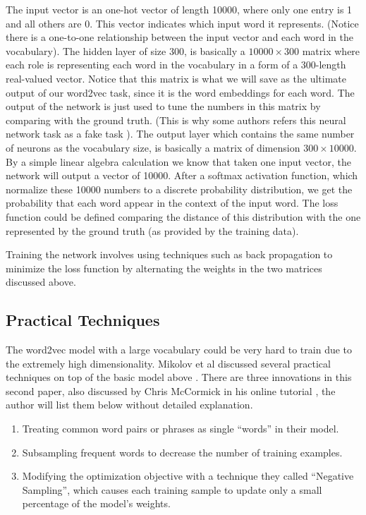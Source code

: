 \documentclass[11pt]{article}
\theoremstyle{plain}
\begin{document}
The input vector is an one-hot vector of length 10000, where only one entry 
is 1 and all others are 0. This vector indicates which input word it represents. 
(Notice there is a one-to-one relationship between the input vector and each 
word in the vocabulary). The hidden layer of size 300, is basically a 
$10000\times 300$ matrix where each role is representing each word in the 
vocabulary in a form of a 300-length real-valued vector. Notice that this 
matrix is what we will save as the ultimate output of our word2vec task, since 
it is the word embeddings for each word. The output of the network is just 
used to tune the numbers in this matrix by comparing with the ground truth. 
(This is why some authors refers this neural network task as a fake task 
\cite{w2v-tutorial}). The output layer which contains the same number of 
neurons as the vocabulary size, is basically a matrix of dimension $300\times 
10000$. By a simple linear algebra calculation we know that taken one input 
vector, the network will output a vector of 10000. After a softmax activation 
function, which normalize these 10000 numbers to a discrete probability 
distribution, we get the probability that each word appear in the context of 
the input word. The loss function could be defined comparing the distance of 
this distribution with the one represented by the ground truth (as provided 
by the training data). 

Training the network involves using techniques such as back propagation to 
minimize the loss function by alternating the weights in the two matrices 
discussed above. 

\subsection{Practical Techniques} 
The word2vec model with a large vocabulary could be very hard to train due 
to the extremely high dimensionality. Mikolov et al discussed several practical 
techniques on top of the basic model above 
\cite{DBLP:journals/corr/MikolovSCCD13}.  There are three innovations in this 
second paper, also discussed by Chris McCormick in his online tutorial 
\cite{w2v-tutorial}, the author will list them below without detailed 
explanation.
\begin{enumerate}
	\item Treating common word pairs or phrases as single “words” in their 
	model.
	\item Subsampling frequent words to decrease the number of training 
	examples.
	\item Modifying the optimization objective with a technique they called 
	“Negative Sampling”, which causes each training sample to update only a 
	small percentage of the model’s weights.
\end{enumerate}
\end{document}
